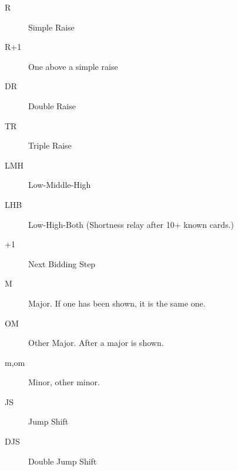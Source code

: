 \documentclass[tom-ari]{subfile}
\begin{document}
\begin{description}
	\item[R] Simple Raise
	\item[R+1] One above a simple raise
	\item[DR] Double Raise
	\item[TR] Triple Raise
	\item[LMH] Low-Middle-High
	\item[LHB] Low-High-Both (Shortness relay after 10+ known cards.)
	\item[+1] Next Bidding Step
	\item[M] Major.  If one has been shown, it is the same one.
	\item[OM] Other Major.  After a major is shown.
	\item[m,om] Minor, other minor.
	\item[JS] Jump Shift
	\item[DJS] Double Jump Shift
\end{description}
\end{document}
